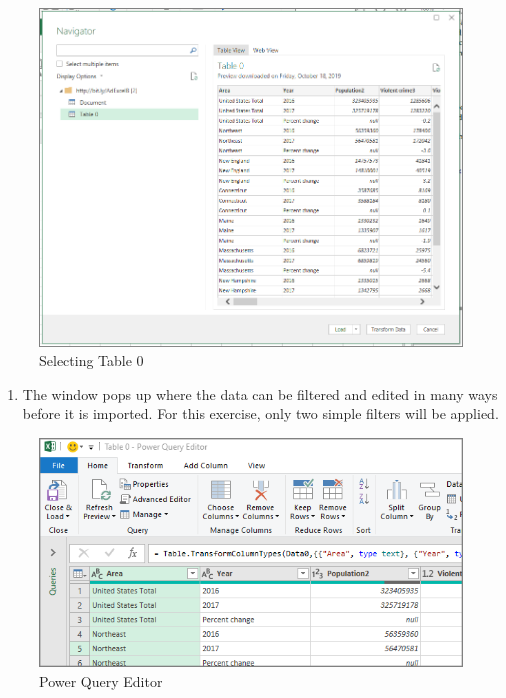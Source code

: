\begin{figure}[H]
	\centering
	\includegraphics[width=\maxwidth{.95\linewidth}]{gfx/ch07_fig02d}
	\caption{Selecting Table 0}
	\label{07:fig02d}
\end{figure}

\begin{enumerate}[resume]
	\item The  window pops up where the data can be filtered and edited in many ways before it is imported. For this exercise, only two simple filters will be applied.
\end{enumerate}

\begin{figure}[H]
	\centering
	\includegraphics[width=\maxwidth{.95\linewidth}]{gfx/ch07_fig02e}
	\caption{Power Query Editor}
	\label{07:fig02e}
\end{figure}

